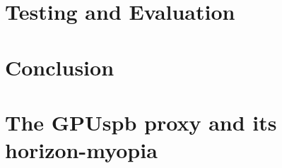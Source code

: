 \chapter{Testing and Evaluation}\label{ch:e2e}


\chapter{Conclusion}\label{ch:conclusion}


\appendix
\chapter{The GPUspb proxy and its horizon-myopia}\label{app:proxy}


\nocite{andreas}





